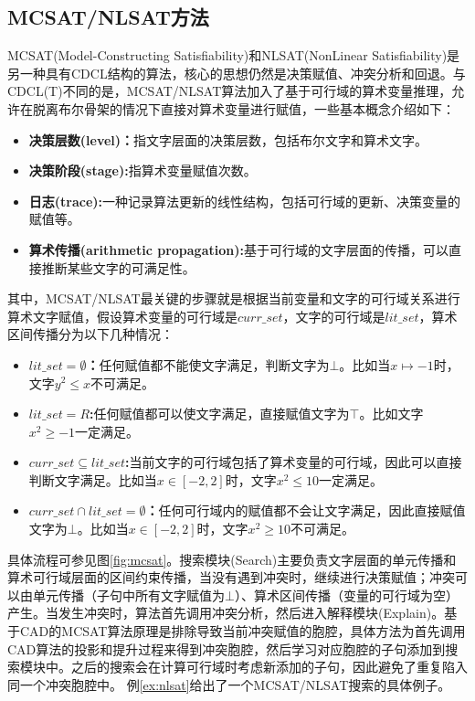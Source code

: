\subsection{MCSAT/NLSAT方法}
MCSAT(Model-Constructing Satisfiability)和NLSAT(NonLinear Satisfiability)是另一种具有CDCL结构的算法，核心的思想仍然是决策赋值、冲突分析和回退。与CDCL(T)不同的是，MCSAT/NLSAT算法加入了基于可行域的算术变量推理，允许在脱离布尔骨架的情况下直接对算术变量进行赋值，一些基本概念介绍如下：
\begin{itemize}
    \item \textbf{决策层数(level)：}指文字层面的决策层数，包括布尔文字和算术文字。
    \item \textbf{决策阶段(stage):}指算术变量赋值次数。
    \item \textbf{日志(trace):}一种记录算法更新的线性结构，包括可行域的更新、决策变量的赋值等。
    \item \textbf{算术传播(arithmetic propagation):}基于可行域的文字层面的传播，可以直接推断某些文字的可满足性。
\end{itemize}
其中，MCSAT/NLSAT最关键的步骤就是根据当前变量和文字的可行域关系进行算术文字赋值，假设算术变量的可行域是$curr\_set$，文字的可行域是$lit\_set$，算术区间传播分为以下几种情况：
\begin{itemize}
    \item \textbf{$lit\_set = \emptyset$：}任何赋值都不能使文字满足，判断文字为$\bot$。比如当$x \mapsto -1$时，文字$y^2 \leq x$不可满足。
    \item \textbf{$lit\_set = R$:}任何赋值都可以使文字满足，直接赋值文字为$\top$。比如文字$x^2 \geq -1$一定满足。
    \item \textbf{$curr\_set \subseteq lit\_set$:}当前文字的可行域包括了算术变量的可行域，因此可以直接判断文字满足。比如当$x \in [-2, 2]$时，文字$x^2 \leq 10$一定满足。
    \item \textbf{$curr\_set \cap lit\_set = \emptyset$：}任何可行域内的赋值都不会让文字满足，因此直接赋值文字为$\bot$。比如当$x \in [-2, 2]$时，文字$x^2 \geq 10$不可满足。
\end{itemize}

具体流程可参见图\ref{fig:mcsat}。搜索模块(Search)主要负责文字层面的单元传播和算术可行域层面的区间约束传播，当没有遇到冲突时，继续进行决策赋值；冲突可以由单元传播（子句中所有文字赋值为$\bot$）、算术区间传播（变量的可行域为空）产生。当发生冲突时，算法首先调用冲突分析，然后进入解释模块(Explain)。基于CAD的MCSAT算法原理是排除导致当前冲突赋值的胞腔，具体方法为首先调用CAD算法的投影和提升过程来得到冲突胞腔，然后学习对应胞腔的子句添加到搜索模块中。之后的搜索会在计算可行域时考虑新添加的子句，因此避免了重复陷入同一个冲突胞腔中。
例\ref{ex:nlsat}给出了一个MCSAT/NLSAT搜索的具体例子。

